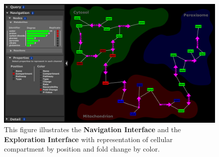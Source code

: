 \begin{figure}[htbp]
\includegraphics[scale=0.5]{sketch_2017-01-02_10}
\centering
\caption{This figure illustrates the \textbf{Navigation Interface} and the \textbf{Exploration Interface} with representation of cellular compartment by position and fold change by color.}
\label{fig:2017-01-02_10}
\end{figure}
